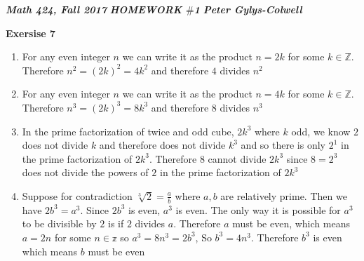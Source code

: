 \documentclass[12pt]{article}
\newcounter{ques}[section]
\newenvironment{ques}[1]{\textbf{Exersise #1} \vspace{1mm}}{\medskip}
\theoremstyle{definition}
\begin{document}
\noindent \textit{\textbf{Math 424, Fall 2017}} \hspace{1.3cm}
\textit{\textbf{HOMEWORK $\#$1}} \hspace{1.3cm} \textit{\textbf{Peter
Gylys-Colwell}} 

\vspace{1cm}

\begin{ques}{7}
	\begin{enumerate}
		\item
			For any even integer $n$ we can write it as the product
			$n = 2k$ for some $k \in \mathbb{Z}$. Therefore $n^2 =
			(2k)^2 = 4k^2$ and therefore $4$ divides $n^2$

		\item
			For any even integer $n$ we can write it as the product
			$n = 4k$ for some $k \in \mathbb{Z}$. Therefore $n^3 =
			(2k)^3 = 8k^3$ and therefore $8$ divides $n^3$

		\item
			In the prime factorization of twice and odd cube,
			$2k^3$ where $k$ odd, we know $2$ does not divide $k$
			and therefore does not divide $k^3$ and so there is
			only $2^1$ in the prime factorization of $2k^3$.
			Therefore $8$ cannot divide $2k^3$ since $8 = 2^3$ does
			not divide the powers of $2$ in the prime factorization
			of $2k^3$

		\item
			Suppose for contradiction $\sqrt[3]{2} = \frac a b$
			where $a,b$ are relatively prime. Then we have $2b^3 =
			a^3$. Since $2b^3$ is even, $a^3$ is even. The only way
			it is possible for $a^3$ to be divisible by $2$ is if
			$2$ divides $a$. Therefore $a$ must be even, which
			means $a = 2n$ for some $n \in \mathbb z$ so $a^3 =
			8n^3 = 2b^3$, So $b^3 = 4n^3$. Therefore $b^3$ is even
			which means $b$ must be even
	\end{enumerate}

\end{ques}
\end{document}
